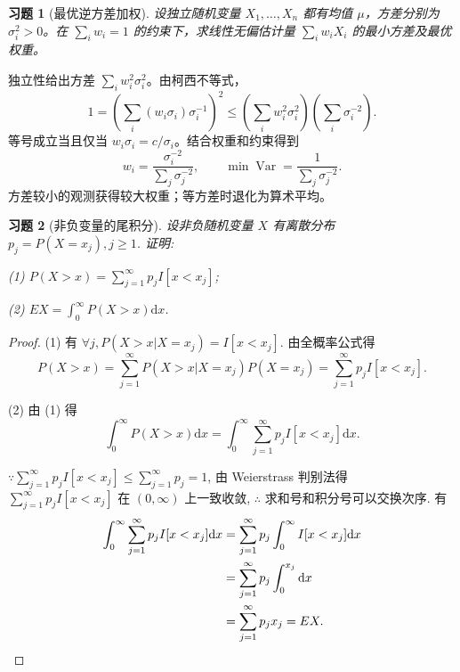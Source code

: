 \documentclass[UTF8,12pt,a4paper,fontset=fandol]{ctexart}
\newtheorem{exercise}{习题}[section]
\begin{document}
\begin{exercise}[最优逆方差加权]\label{q:A5.22}
设独立随机变量 $X_1,\ldots,X_n$ 都有均值 $\mu$，方差分别为 $\sigma_i^2>0$。在 $\sum_iw_i=1$ 的约束下，求线性无偏估计量 $\sum_iw_iX_i$ 的最小方差及最优权重。\par{}
\end{exercise}

\begin{solve}\label{a:A5.22}独立性给出方差 $\sum_iw_i^2\sigma_i^2$。由柯西不等式，\[1=\left(\sum_i(w_i\sigma_i)\sigma_i^{-1}\right)^2\le\left(\sum_iw_i^2\sigma_i^2\right)\left(\sum_i\sigma_i^{-2}\right).\]等号成立当且仅当 $w_i\sigma_i=c/\sigma_i$。结合权重和约束得到\[w_i=\frac{\sigma_i^{-2}}{\sum_j\sigma_j^{-2}},\qquad\min\operatorname{Var}=\frac{1}{\sum_j\sigma_j^{-2}}.\]方差较小的观测获得较大权重；等方差时退化为算术平均。\end{solve}

\begin{exercise}[非负变量的尾积分]\label{q:A5.25}
设非负随机变量 $X$ 有离散分布 $p_j=P(X=x_j),j\geq 1$. 证明:
    
    (1) $P(X>x)=\sum\limits_{j=1}^\infty p_jI[x<x_j]$;

    (2) $EX=\int_0^\infty P(X>x)\mathrm{d}x$.\par{}
\end{exercise}

\begin{proof}\label{a:A5.25}
    (1) 有 $\forall j,P(X>x|X=x_j)=I[x<x_j]$. 由全概率公式得
    \[P(X>x)=\sum\limits_{j=1}^\infty P(X>x|X=x_j)P(X=x_j)=\sum\limits_{j=1}^\infty p_jI[x<x_j].\]

    (2) 由 (1) 得
    \[\int_0^\infty P(X>x)\mathrm{d}x=\int_0^\infty\sum\limits_{j=1}^\infty p_jI[x<x_j]\mathrm{d}x.\]

    $\because\sum\limits_{j=1}^\infty p_jI[x<x_j]\leq\sum\limits_{j=1}^\infty p_j=1$, 由 Weierstrass 判别法得 $\sum\limits_{j=1}^\infty p_jI[x<x_j]$ 在 $(0,\infty)$ 上一致收敛, $\therefore$ 求和号和积分号可以交换次序. 有
    \begin{align*}
        \int_0^\infty\sum\limits_{j=1}^\infty p_jI[x<x_j]\mathrm{d}x & =\sum\limits_{j=1}^\infty p_j\int_0^\infty I[x<x_j]\mathrm{d}x \\
        & =\sum\limits_{j=1}^\infty p_j\int_0^{x_j}\mathrm{d}x \\
        & =\sum\limits_{j=1}^\infty p_jx_j=EX.\qedhere
    \end{align*}
\end{proof}
\end{document}
